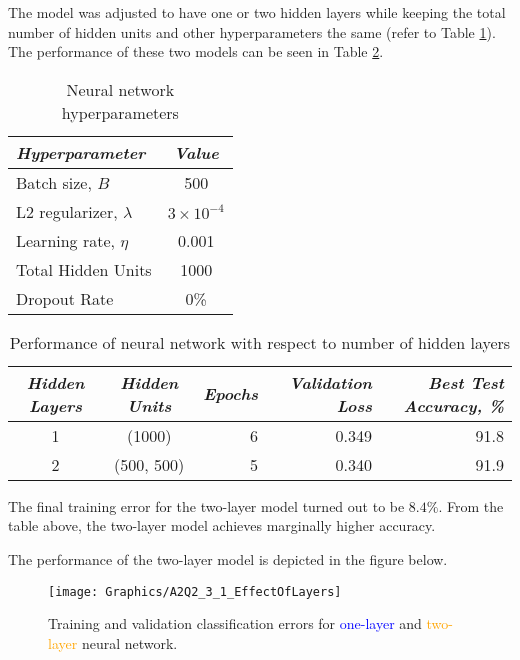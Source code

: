 \documentclass[a4paper,12pt]{article}
\begin{document}
The model was adjusted to have one or two hidden layers while keeping the total number of hidden units and other hyperparameters the same (refer to Table \ref{table:NN_HParam_2_3_2}). The performance of these two models can be seen in Table \ref{table:NN_NumLayers}.

\begin{table}[!htb]
\centering
\caption{Neural network hyperparameters}
\label{table:NN_HParam_2_3_2}
\vspace{0.5em}
\begin{tabular}{|l|c|} \hline
\textit{Hyperparameter} & \textit{Value} \\ \hline
Batch size, $B$ & 500 \\
L2 regularizer, $\lambda$ & $3 \times 10^{-4}$  \\
Learning rate, $\eta$ & 0.001 \\
Total Hidden Units & 1000 \\
Dropout Rate & 0\% \\
\hline
\end{tabular}
\end{table}

\begin{table}[!htb]
\centering
\caption{Performance of neural network with respect to number of hidden layers}
\label{table:NN_NumLayers}
\vspace{0.5em}
\begin{tabular}{|c c|r r r|} \hline
\textit{Hidden Layers} & \textit{Hidden Units} & \textit{Epochs} & \textit{Validation Loss} & \textit{Best Test Accuracy, \%} \\ \hline
1 & (1000) & 6 & 0.349 & 91.8 \\
2 & (500, 500) & 5 & 0.340 & 91.9 \\
\hline
\end{tabular}
\end{table}

The final training error for the two-layer model turned out to be $8.4\%$. From the table above, the two-layer model achieves marginally higher accuracy.

The performance of the two-layer model is depicted in the figure below.

\begin{figure}[!htb]
\centering
\texttt{[image: Graphics/A2Q2\_3\_1\_EffectOfLayers]}
\caption{\label{figure:NN_EffectOfLayers} Training and validation classification errors for \textcolor{blue}{one-layer} and \textcolor{orange}{two-layer} neural network.}
\end{figure}
\end{document}
